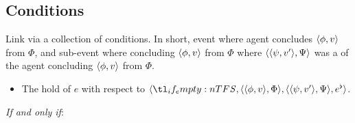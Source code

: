\subsection{Conditions}
\label{sec:conditions}

\begin{note}
  Link via a collection of conditions.
  In short, event where agent concludes \(\langle \phi, v \rangle\) from \(\Phi\), and sub-event where concluding \(\langle \phi, v \rangle\) from \(\Phi\) where \(\langle \langle \psi, v' \rangle, \Psi \rangle\) was a \requ{} of the agent concluding \(\langle \phi, v \rangle\) from \(\Phi\).

  \begin{definition}[\rCon{2}]
    \label{def:rCon}

    \begin{itemize}
    \item
      The \emph{} hold of \(e\) with respect to \(\langle \vAgent{}, \pvp{\phi}{v}{\Phi}, \pvp{\psi}{v'}{\Psi}, e^{\flat} \rangle\).
    \end{itemize}

    \emph{If and only if}:


\end{definition}
\end{note}
